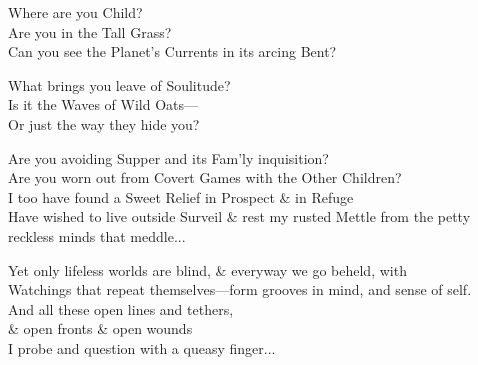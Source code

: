 Where are you Child? \\
Are you in the Tall Grass? \\
Can you see the Planet's Currents in its arcing Bent? 

What brings you leave of Soulitude? \\
Is it the Waves of Wild Oats— \\
Or just the way they hide you? 

Are you avoiding Supper and its Fam'ly inquisition? \\
Are you worn out from Covert Games with the Other Children? \\

I too have found a Sweet Relief in Prospect \& in Refuge \\
Have wished to live outside Surveil \& rest my rusted Mettle from the petty reckless minds that meddle...

Yet only lifeless worlds are blind, \& everyway we go beheld, with \\
Watchings that repeat themselves—form grooves in mind, and sense of self. \\
And all these open lines and tethers, \\
\qquad \& open fronts \& open wounds \\
\qquad I probe and question with a queasy finger...